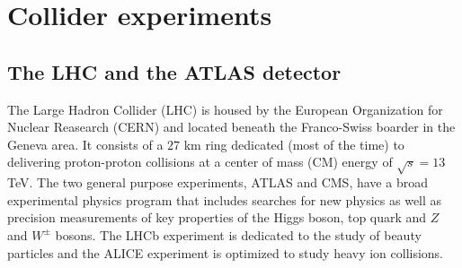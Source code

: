 
\section{Collider experiments}
\label{sec:det}

\subsection{The LHC and the ATLAS detector}
 
The Large Hadron Collider (LHC) is housed by the European Organization for Nuclear Reasearch (CERN) and located beneath the Franco-Swiss boarder in the Geneva area. It consists of a $27$ km ring dedicated (most of the time) to delivering proton-proton collisions at a center of mass (CM) energy of $\sqrt{s}=13$ TeV. The two general purpose experiments, ATLAS and CMS, have a broad experimental physics program that includes searches for new physics as well as precision measurements of key properties of the Higgs boson, top quark and $Z$ and $W^{\pm}$ bosons. The LHCb experiment is dedicated to the study of beauty particles and the ALICE experiment is optimized to study heavy ion collisions. 

